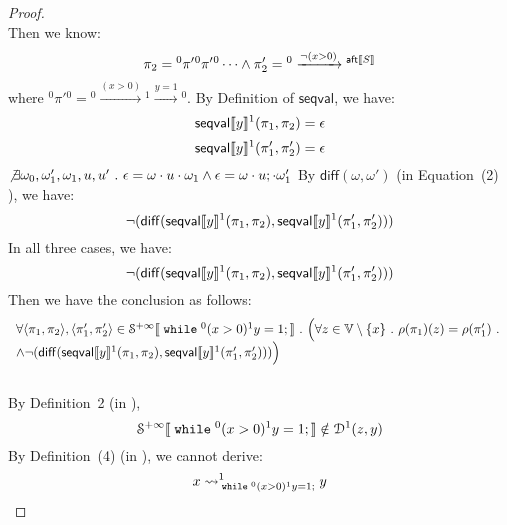 \begin{example}
\begin{proof}
\[ \]
 Then we know:
 \[
 \pi_2 = {}^0 \pi' {}^0 \pi' {}^0\cdots 
 \land 
 \pi_2' = {}^0 \xrightarrow{\neg(x > 0)} {}^{\mathsf{aft}\llbracket S \rrbracket}
 \]
 where ${}^0 \pi' {}^0 = {}^0 \xrightarrow{(x > 0)} {}^1 \xrightarrow{y = 1} {}^0$.
 By Definition of $\mathsf{seqval}$, we have:
 \[
  \mathsf{seqval}\llbracket y \rrbracket{}^1(\pi_1, \pi_2 ) = \epsilon
 \]
 \[
  \mathsf{seqval}\llbracket y \rrbracket{}^1(\pi_1', \pi_2' ) = \epsilon
 \]
  $\not \exists \omega_0, \omega_1', \omega_1, u, u' ~.~ 
  \epsilon = \omega \cdot u \cdot \omega_1 
  \land 
  \epsilon = \omega \cdot u; \cdot \omega_1'$
 By $\mathsf{diff}(\omega, \omega')$ (in \cite{cousot2019abstract} Equation~(2) ), we have:
 \[
  \neg(\mathsf{diff}(\mathsf{seqval}\llbracket y \rrbracket{}^1(\pi_1, \pi_2 ), \mathsf{seqval}\llbracket y \rrbracket{}^1(\pi_1', \pi_2' )))
 \]
 In all three cases, we have:
 \[
   \neg(\mathsf{diff}(\mathsf{seqval}\llbracket y \rrbracket{}^1(\pi_1, \pi_2 ), \mathsf{seqval}\llbracket y \rrbracket{}^1(\pi_1', \pi_2' )))
 \]
 Then we have the conclusion as follows:
 \[
 \begin{array}{l}
 	\forall \left< \pi_1, \pi_2 \right>,  \left< \pi_1', \pi'_2 \right> \in \mathcal{S}^{+\infty} \sem{\ewhile {}^0 (x > 0) {}^1 y = 1;} \st
 	\Big(
 	\forall z \in \mathbb{V}\setminus \{x\} \st \env(\pi_1)(z) = \env(\pi_1') \st \\
 	\land \neg(\mathsf{diff}(\mathsf{seqval}\sem{y}{}^1(\pi_1, \pi_2), \mathsf{seqval}\sem{y}{}^1(\pi_1', \pi_2' )))\Big)
 \end{array}
 \] 
 \\
 By Definition~2 (in \cite{cousot2019abstract}), 
 \[
 	\mathcal{S}^{+\infty}\llbracket \;\mathtt{while}\; {}^0 (x > 0) {}^1 y = 1; \rrbracket 
 \notin \mathcal{D}^1(z, y)
 \]
 By Definition~(4) (in \cite{cousot2019abstract}), we cannot derive:
 \[
 	x \rightsquigarrow^{1}_{\;\mathtt{while}\; {}^0 (x > 0) {}^1 y = 1;} y
 \]
 \end{proof}
 \end{example}
 \clearpage
